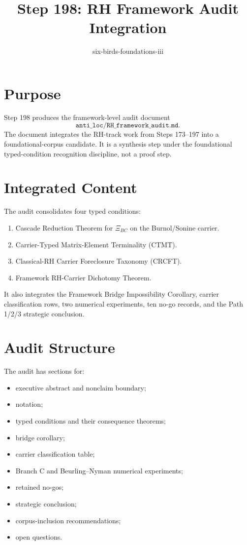 \documentclass[11pt]{article}
\title{Step 198: RH Framework Audit Integration}
\author{six-birds-foundations-iii}
\date{}
\begin{document}
\maketitle

\section*{Purpose}

Step 198 produces the framework-level audit document
\[
\texttt{anti\_loc/RH\_framework\_audit.md}.
\]
The document integrates the RH-track work from Steps 173--197 into a
foundational-corpus candidate.  It is a synthesis step under the
foundational typed-condition recognition discipline, not a proof step.

\section*{Integrated Content}

The audit consolidates four typed conditions:
\begin{enumerate}
\item Cascade Reduction Theorem for \(\Xi_{BC}\) on the Burnol/Sonine carrier.
\item Carrier-Typed Matrix-Element Terminality (CTMT).
\item Classical-RH Carrier Foreclosure Taxonomy (CRCFT).
\item Framework RH-Carrier Dichotomy Theorem.
\end{enumerate}

It also integrates the Framework Bridge Impossibility Corollary, carrier
classification rows, two numerical experiments, ten no-go records, and the
Path 1/2/3 strategic conclusion.

\section*{Audit Structure}

The audit has sections for:
\begin{itemize}
\item executive abstract and nonclaim boundary;
\item notation;
\item typed conditions and their consequence theorems;
\item bridge corollary;
\item carrier classification table;
\item Branch C and Beurling--Nyman numerical experiments;
\item retained no-gos;
\item strategic conclusion;
\item corpus-inclusion recommendations;
\item open questions.
\end{itemize}
\end{document}
